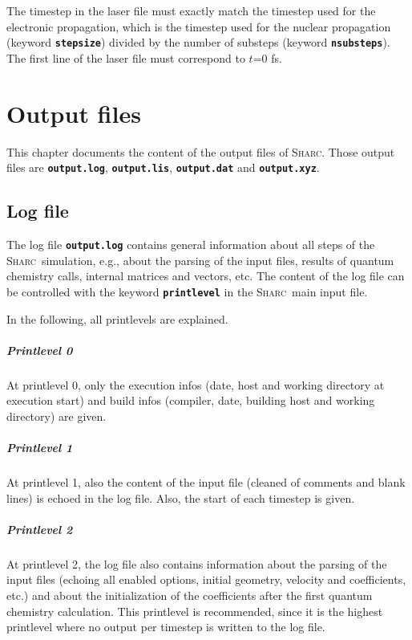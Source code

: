 \documentclass[a4paper,11pt,DIV=15,openany,twoside=false]{scrbook}
\newcommand{\sharc}{\textsc{Sharc}}
\newcommand{\ttt}[1]{\textbf{\texttt{#1}}}
\begin{document}
The timestep in the laser file must exactly match the timestep used for the electronic propagation, which is the timestep used for the nuclear propagation (keyword \ttt{stepsize}) divided by the number of substeps (keyword \ttt{nsubsteps}). The first line of the laser file must correspond to $t$=0 fs.

\chapter{Output files}\label{chap:output}

This chapter documents the content of the output files of \sharc. Those output files are \ttt{output.log}, \ttt{output.lis}, \ttt{output.dat} and \ttt{output.xyz}.

\section{Log file}\label{sec:logfile}

The log file \ttt{output.log} contains general information about all steps of the \sharc\ simulation, e.g., about the parsing of the input files, results of quantum chemistry calls, internal matrices and vectors, etc. The content of the log file can be controlled with the keyword \ttt{printlevel} in the \sharc\ main input file.

In the following, all printlevels are explained.

\paragraph{Printlevel 0}

At printlevel 0, only the execution infos (date, host and working directory at execution start) and build infos (compiler, date, building host and working directory) are given.

\paragraph{Printlevel 1}

At printlevel 1, also the content of the input file (cleaned of comments and blank lines) is echoed in the log file. Also, the start of each timestep is given.

\paragraph{Printlevel 2}

At printlevel 2, the log file also contains information about the parsing of the input files (echoing all enabled options, initial geometry, velocity and coefficients, etc.) and about the initialization of the coefficients after the first quantum chemistry calculation. This printlevel is recommended, since it is the highest printlevel where no output per timestep is written to the log file.
\end{document}
